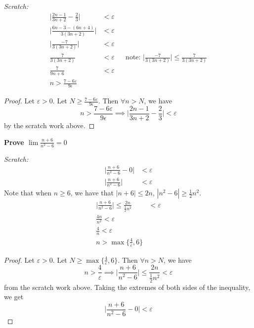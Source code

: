 \documentclass[13pt]{letter}
\begin{document}
\textit{Scratch:}
  \begin{align*}
    \bigg| \frac{2n - 1}{3n + 2} - \frac{2}{3} \bigg| &< \varepsilon \\
    \bigg| \frac{6n - 3 - (6n + 4)}{3(3n + 2)} \bigg| &< \varepsilon \\
    \bigg| \frac{-7}{3(3n + 2)} \bigg| &< \varepsilon \\
    \frac{7}{3(3n + 2)} &< \varepsilon && \text{note: } \bigg|
                                          \frac{-7}{3(3n + 2)} \bigg|
                                          \leq \frac{7}{3(3n + 2)} \\
    \frac{7}{9n + 6} &< \varepsilon \\
    n > \frac{7 - 6\varepsilon}{9\epsilon}
  \end{align*}
\begin{proof}
  Let $\varepsilon > 0$. Let $N \geq \frac{7 - 6\varepsilon}{9\epsilon}$. Then
  $\forall n > N$, we have
  \[n > \frac{7 - 6\varepsilon}{9\epsilon} \implies \bigg|
    \frac{2n - 1}{3n + 2} - \frac{2}{3} \bigg| < \varepsilon\] 
  by the scratch work above.
\end{proof}

\textbf{Prove $\lim \frac{n + 6}{n^2 - 6} = 0$}

\textit{Scratch:}
\begin{align*}
  \bigg| \frac{n + 6}{n^2 - 6} - 0 \bigg| &< \varepsilon \\
  \bigg| \frac{n + 6}{n^2 - 6} \bigg| &< \varepsilon
\end{align*}
Note that when $n \geq 6$, we have that $|n + 6| \leq 2n$, $|n^2 - 6|
\geq \frac{1}{2}n^2$.
\begin{align*}
  \bigg| \frac{n + 6}{n^2 - 6} \bigg| \leq \frac{2n}{\frac{1}{2}n^2}
  &< \varepsilon \\
  \frac{4n}{n^2} < \varepsilon \\
  \frac{4}{n} < \varepsilon \\
  n > \max{\{\frac{4}{\varepsilon}, 6\}}
\end{align*}
\begin{proof}
  Let $\varepsilon > 0$. Let $N \geq \max{\{\frac{4}{\varepsilon}, 6\}}$. Then
  $\forall n > N$, we have
  \[n > \frac{4}{\varepsilon} \implies \bigg| \frac{n + 6}{n^2 - 6}
    \bigg| \leq \frac{2n}{\frac{1}{2}n^2} < \varepsilon\]
  from the scratch work above. Taking the extremes of both sides of
  the inequality, we get
  \[\bigg| \frac{n + 6}{n^2 - 6} - 0 \bigg| < \varepsilon\]
\end{proof}
\end{document}
